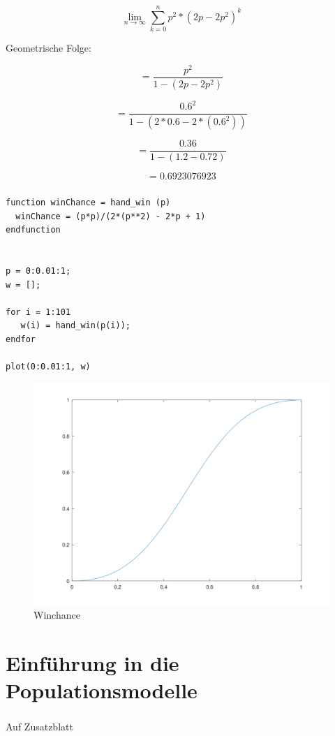 \documentclass{article}
\begin{document}
$$\lim_{n\to\infty} \sum_{k=0}^{n} p^2 * (2p-2p^2)^k$$

Geometrische Folge:

\[=\frac{p^2}{1-(2p-2p^2)}\]

\[=\frac{0.6^2}{1-(2*0.6-2*(0.6^2))}\]

\[=\frac{0.36}{1-(1.2-0.72)}\]

\[=0.6923076923\]

\subsubsection{}

\begin{lstlisting}
function winChance = hand_win (p)
  winChance = (p*p)/(2*(p**2) - 2*p + 1)
endfunction


p = 0:0.01:1;
w = [];

for i = 1:101
   w(i) = hand_win(p(i));
endfor

plot(0:0.01:1, w)
\end{lstlisting}

\begin{figure}[H]
\centering
\includegraphics[scale=0.2]{winplot.png}
\caption{Winchance}
\label{fig:universe}
\end{figure}




\section{Einführung in die Populationsmodelle}
\subsubsection{}
Auf Zusatzblatt
\end{document}
